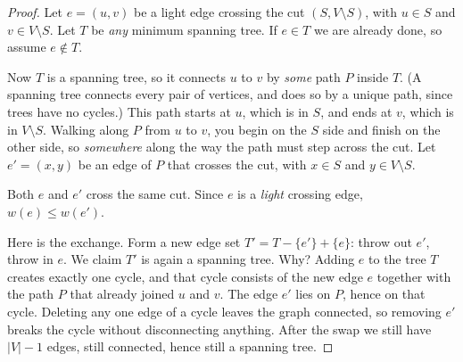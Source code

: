 \begin{proof}
Let $e = (u,v)$ be a light edge crossing the cut $(S, V\setminus S)$, with
$u \in S$ and $v \in V\setminus S$. Let $T$ be \emph{any} minimum spanning tree.
If $e \in T$ we are already done, so assume $e \notin T$.

Now $T$ is a spanning tree, so it connects $u$ to $v$ by \emph{some} path $P$
inside $T$. (A spanning tree connects every pair of vertices, and does so by a
unique path, since trees have no cycles.) This path starts at $u$, which is in
$S$, and ends at $v$, which is in $V\setminus S$. Walking along $P$ from $u$ to
$v$, you begin on the $S$ side and finish on the other side, so \emph{somewhere}
along the way the path must step across the cut. Let $e' = (x,y)$ be an edge of
$P$ that crosses the cut, with $x \in S$ and $y \in V\setminus S$.

\begin{center}
\end{center}

Both $e$ and $e'$ cross the same cut. Since $e$ is a \emph{light} crossing edge,
$w(e) \le w(e')$.

Here is the exchange. Form a new edge set $T' = T - \{e'\} + \{e\}$: throw out
$e'$, throw in $e$. We claim $T'$ is again a spanning tree. Why? Adding $e$ to the
tree $T$ creates exactly one cycle, and that cycle consists of the new edge $e$
together with the path $P$ that already joined $u$ and $v$. The edge $e'$ lies on
$P$, hence on that cycle. Deleting any one edge of a cycle leaves the graph
connected, so removing $e'$ breaks the cycle without disconnecting anything.
After the swap we still have $|V|-1$ edges, still connected, hence still a
spanning tree.


\end{proof}
